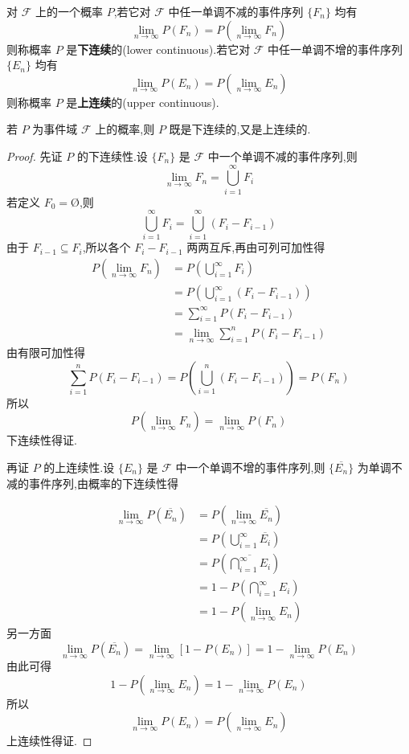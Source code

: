 \begin{definition}
    \indent 对 $\mathcal{F}$ 上的一个概率 $P$,若它对 $\mathcal{F}$ 中任一单调不减的事件序列 $\{F_n\}$ 均有
    $$
    \lim_{n \to \infty} P(F_n) = P(\lim_{n \to \infty} F_n)
    $$
    则称概率 $P$ 是\textbf{下连续}的(lower continuous).若它对 $\mathcal{F}$ 中任一单调不增的事件序列 $\{E_n\}$ 均有
    $$
    \lim_{n \to \infty} P(E_n) = P(\lim_{n \to \infty} E_n)
    $$
    则称概率 $P$ 是\textbf{上连续}的(upper continuous).
\end{definition}

\begin{property}
    \indent 若 $P$ 为事件域 $\mathcal{F}$ 上的概率,则 $P$ 既是下连续的,又是上连续的.
\end{property}

\begin{proof}
    先证 $P$ 的下连续性.设 $\{ F_n \}$ 是 $\mathcal{F}$ 中一个单调不减的事件序列,则
    $$
    \lim_{n \to \infty} F_n = \bigcup_{i=1}^{\infty} F_i
    $$
    若定义 $F_0 = \text{\O}$,则
    $$
    \bigcup_{i=1}^{\infty} F_i = \bigcup_{i=1}^{\infty} (F_i - F_{i-1})
    $$
    由于 $F_{i-1} \subseteq F_i$,所以各个 $F_i - F_{i-1}$ 两两互斥,再由可列可加性得
    $$
    \begin{aligned}
        P(\lim_{n \to \infty} F_n) &= P \left( \bigcup_{i=1}^{\infty} F_i \right) \\
        &= P \left( \bigcup_{i=1}^{\infty} (F_i - F_{i-1}) \right) \\
        &= \sum_{i=1}^{\infty} P(F_i - F_{i-1}) \\
        &= \lim_{n \to \infty} \sum_{i=1}^n P(F_i - F_{i-1})
    \end{aligned}
    $$
    由有限可加性得
    $$
    \sum_{i=1}^n P(F_i - F_{i-1}) = P \left( \bigcup_{i=1}^n (F_i - F_{i-1}) \right) = P(F_n)
    $$
    所以
    $$
    P(\lim_{n \to \infty} F_n) = \lim_{n \to \infty} P(F_n)
    $$
    下连续性得证.

    再证 $P$ 的上连续性.设 $\{ E_n \}$ 是 $\mathcal{F}$ 中一个单调不增的事件序列,则 $\{ \overline{E_n} \}$ 为单调不减的事件序列,由概率的下连续性得

    $$
    \begin{aligned}
        \lim_{n \to \infty} P(\overline{E_n}) &= P(\lim_{n \to \infty} \overline{E_n}) \\
        &= P \left( \bigcup_{i=1}^{\infty} \overline{E_i} \right) \\
        &= P \left(\overline{\bigcap_{i=1}^{\infty} E_i} \right) \\
        &= 1 - P \left(\bigcap_{i=1}^{\infty} E_i \right) \\
        &= 1 - P(\lim_{n \to \infty} E_n)
    \end{aligned}
    $$
    另一方面
    $$
    \lim_{n \to \infty} P(\overline{E_n}) = \lim_{n \to \infty} [1 - P(E_n)] = 1 - \lim_{n \to \infty} P(E_n)
    $$
    由此可得
    $$
    1 - P(\lim_{n \to \infty} E_n) = 1 - \lim_{n \to \infty} P(E_n)
    $$
    所以
    $$
    \lim_{n \to \infty} P(E_n) = P(\lim_{n \to \infty} E_n)
    $$
    上连续性得证.
\end{proof}

